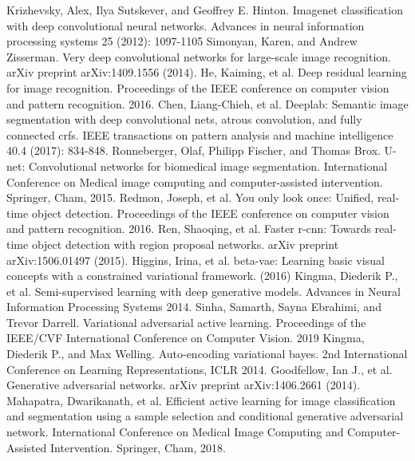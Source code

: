\documentclass[runningheads]{llncs}
\begin{document}
%
%
%

%
%
\begin{thebibliography}{8}
    Krizhevsky, Alex, Ilya Sutskever, and Geoffrey E. Hinton. Imagenet classification with deep convolutional neural networks. Advances in neural information processing systems 25 (2012): 1097-1105
    Simonyan, Karen, and Andrew Zisserman. Very deep convolutional networks for large-scale image recognition. arXiv preprint arXiv:1409.1556 (2014).
    He, Kaiming, et al. Deep residual learning for image recognition. Proceedings of the IEEE conference on computer vision and pattern recognition. 2016.
    Chen, Liang-Chieh, et al. Deeplab: Semantic image segmentation with deep convolutional nets, atrous convolution, and fully connected crfs. IEEE transactions on pattern analysis and machine intelligence 40.4 (2017): 834-848.
    Ronneberger, Olaf, Philipp Fischer, and Thomas Brox. U-net: Convolutional networks for biomedical image segmentation. International Conference on Medical image computing and computer-assisted intervention. Springer, Cham, 2015.
    Redmon, Joseph, et al. You only look once: Unified, real-time object detection. Proceedings of the IEEE conference on computer vision and pattern recognition. 2016.
    Ren, Shaoqing, et al. Faster r-cnn: Towards real-time object detection with region proposal networks. arXiv preprint arXiv:1506.01497 (2015).
    Higgins, Irina, et al. beta-vae: Learning basic visual concepts with a constrained variational framework. (2016)
    Kingma, Diederik P., et al. Semi-supervised learning with deep generative models. Advances in Neural Information Processing Systems 2014.
    Sinha, Samarth, Sayna Ebrahimi, and Trevor Darrell. Variational adversarial active learning. Proceedings of the IEEE/CVF International Conference on Computer Vision. 2019
    Kingma, Diederik P., and Max Welling. Auto-encoding variational bayes. 2nd International Conference on Learning Representations, {ICLR} 2014.
    Goodfellow, Ian J., et al. Generative adversarial networks. arXiv preprint arXiv:1406.2661 (2014).
    Mahapatra, Dwarikanath, et al. Efficient active learning for image classification and segmentation using a sample selection and conditional generative adversarial network. International Conference on Medical Image Computing and Computer-Assisted Intervention. Springer, Cham, 2018.

\end{thebibliography}
\end{document}
